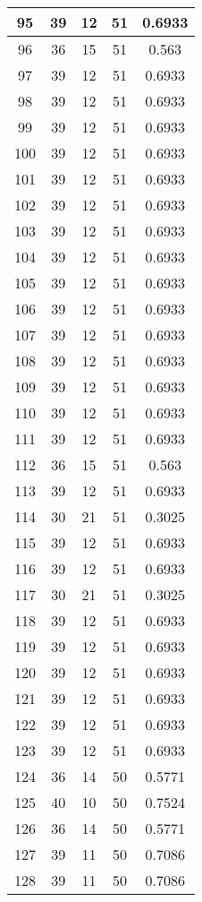 \documentclass[letterpaper, 12pt]{article}
\begin{document}
\begin{longtable}{|c|c|c|c|c|}
\hline
95 & 39 & 12 & 51 & 0.6933 \\
\hline
96 & 36 & 15 & 51 & 0.563 \\
\hline
97 & 39 & 12 & 51 & 0.6933 \\
\hline
98 & 39 & 12 & 51 & 0.6933 \\
\hline
99 & 39 & 12 & 51 & 0.6933 \\
\hline
100 & 39 & 12 & 51 & 0.6933 \\
\hline
101 & 39 & 12 & 51 & 0.6933 \\
\hline
102 & 39 & 12 & 51 & 0.6933 \\
\hline
103 & 39 & 12 & 51 & 0.6933 \\
\hline
104 & 39 & 12 & 51 & 0.6933 \\
\hline
105 & 39 & 12 & 51 & 0.6933 \\
\hline
106 & 39 & 12 & 51 & 0.6933 \\
\hline
107 & 39 & 12 & 51 & 0.6933 \\
\hline
108 & 39 & 12 & 51 & 0.6933 \\
\hline
109 & 39 & 12 & 51 & 0.6933 \\
\hline
110 & 39 & 12 & 51 & 0.6933 \\
\hline
111 & 39 & 12 & 51 & 0.6933 \\
\hline
112 & 36 & 15 & 51 & 0.563 \\
\hline
113 & 39 & 12 & 51 & 0.6933 \\
\hline
114 & 30 & 21 & 51 & 0.3025 \\
\hline
115 & 39 & 12 & 51 & 0.6933 \\
\hline
116 & 39 & 12 & 51 & 0.6933 \\
\hline
117 & 30 & 21 & 51 & 0.3025 \\
\hline
118 & 39 & 12 & 51 & 0.6933 \\
\hline
119 & 39 & 12 & 51 & 0.6933 \\
\hline
120 & 39 & 12 & 51 & 0.6933 \\
\hline
121 & 39 & 12 & 51 & 0.6933 \\
\hline
122 & 39 & 12 & 51 & 0.6933 \\
\hline
123 & 39 & 12 & 51 & 0.6933 \\
\hline
124 & 36 & 14 & 50 & 0.5771 \\
\hline
125 & 40 & 10 & 50 & 0.7524 \\
\hline
126 & 36 & 14 & 50 & 0.5771 \\
\hline
127 & 39 & 11 & 50 & 0.7086 \\
\hline
128 & 39 & 11 & 50 & 0.7086 \\

\end{longtable}
\end{document}
